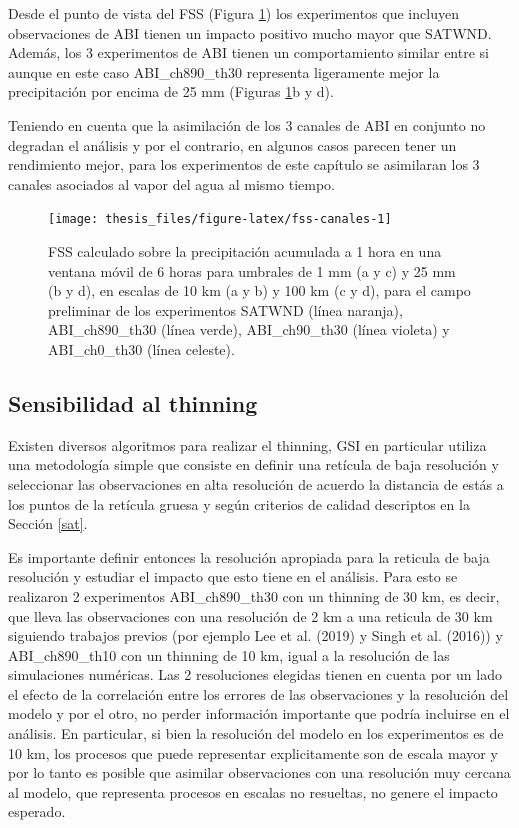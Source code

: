 \documentclass[12pt,oneside,a4paper]{reedthesis}
\begin{document}
Desde el punto de vista del FSS (Figura \ref{fig:fss-canales}) los experimentos que incluyen observaciones de ABI tienen un impacto positivo mucho mayor que SATWND. Además, los 3 experimentos de ABI tienen un comportamiento similar entre si aunque en este caso ABI\_ch890\_th30 representa ligeramente mejor la precipitación por encima de 25 mm (Figuras \ref{fig:fss-canales}b y d).

Teniendo en cuenta que la asimilación de los 3 canales de ABI en conjunto no degradan el análisis y por el contrario, en algunos casos parecen tener un rendimiento mejor, para los experimentos de este capítulo se asimilaran los 3 canales asociados al vapor del agua al mismo tiempo.


\begin{figure}
\texttt{[image: thesis\_files/figure-latex/fss-canales-1]} \caption{FSS calculado sobre la precipitación acumulada a 1 hora en una ventana móvil de 6 horas para umbrales de 1 mm (a y c) y 25 mm (b y d), en escalas de 10 km (a y b) y 100 km (c y d), para el campo preliminar de los experimentos SATWND (línea naranja), ABI\_ch890\_th30 (línea verde), ABI\_ch90\_th30 (línea violeta) y ABI\_ch0\_th30 (línea celeste).}\label{fig:fss-canales}
\end{figure}
\hypertarget{thinning}{%
\subsection{Sensibilidad al thinning}\label{thinning}}

Existen diversos algoritmos para realizar el thinning, GSI en particular utiliza una metodología simple que consiste en definir una retícula de baja resolución y seleccionar las observaciones en alta resolución de acuerdo la distancia de estás a los puntos de la retícula gruesa y según criterios de calidad descriptos en la Sección \ref{sat}.

Es importante definir entonces la resolución apropiada para la reticula de baja resolución y estudiar el impacto que esto tiene en el análisis. Para esto se realizaron 2 experimentos ABI\_ch890\_th30 con un thinning de 30 km, es decir, que lleva las observaciones con una resolución de 2 km a una reticula de 30 km siguiendo trabajos previos (por ejemplo Lee et al. (2019) y Singh et al. (2016)) y ABI\_ch890\_th10 con un thinning de 10 km, igual a la resolución de las simulaciones numéricas. Las 2 resoluciones elegidas tienen en cuenta por un lado el efecto de la correlación entre los errores de las observaciones y la resolución del modelo y por el otro, no perder información importante que podría incluirse en el análisis. En particular, si bien la resolución del modelo en los experimentos es de 10 km, los procesos que puede representar explicitamente son de escala mayor y por lo tanto es posible que asimilar observaciones con una resolución muy cercana al modelo, que representa procesos en escalas no resueltas, no genere el impacto esperado.
\end{document}
